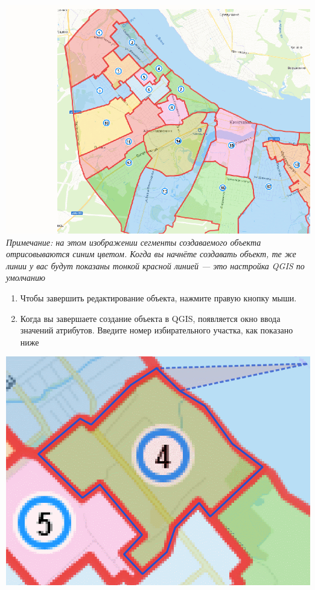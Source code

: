 \documentclass[
  12pt,
]{book}
\begin{document}
\includegraphics{images/Ex05_Vectorization/new_object.gif}
\emph{Примечание: на этом изображении сегменты создаваемого объекта отрисовываются синим цветом. Когда вы начнёте создавать объект, те же линии у вас будут показаны тонкой красной линией --- это настройка QGIS по умолчанию}

\begin{enumerate}
\def\labelenumi{\arabic{enumi}.}
\setcounter{enumi}{4}
\item
  Чтобы завершить редактирование объекта, нажмите правую кнопку мыши.
\item
  Когда вы завершаете создание объекта в QGIS, появляется окно ввода значений атрибутов. Введите номер избирательного участка, как показано ниже
\end{enumerate}

\includegraphics{images/Ex05_Vectorization/new_attribute.gif}
\end{document}

